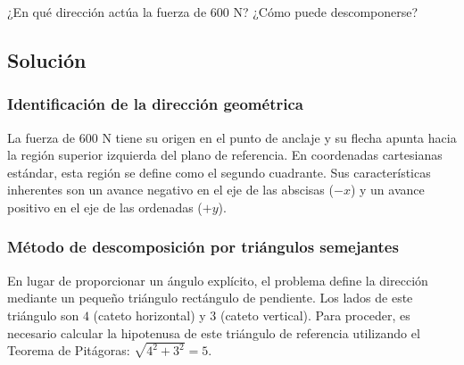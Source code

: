 \documentclass[12pt, a4paper]{article}
\begin{document}
\begin{center}
\end{center}

¿En qué dirección actúa la fuerza de $600 \text{ N}$? ¿Cómo puede descomponerse?

\subsection*{Solución}

\subsubsection*{Identificación de la dirección geométrica}
La fuerza de $600 \text{ N}$ tiene su origen en el punto de anclaje y su flecha apunta hacia la región superior izquierda del plano de referencia. En coordenadas cartesianas estándar, esta región se define como el segundo cuadrante. Sus características inherentes son un avance negativo en el eje de las abscisas ($-x$) y un avance positivo en el eje de las ordenadas ($+y$).

\subsubsection*{Método de descomposición por triángulos semejantes}
En lugar de proporcionar un ángulo explícito, el problema define la dirección mediante un pequeño triángulo rectángulo de pendiente. Los lados de este triángulo son $4$ (cateto horizontal) y $3$ (cateto vertical). Para proceder, es necesario calcular la hipotenusa de este triángulo de referencia utilizando el Teorema de Pitágoras: $\sqrt{4^2 + 3^2} = 5$. 
\end{document}
